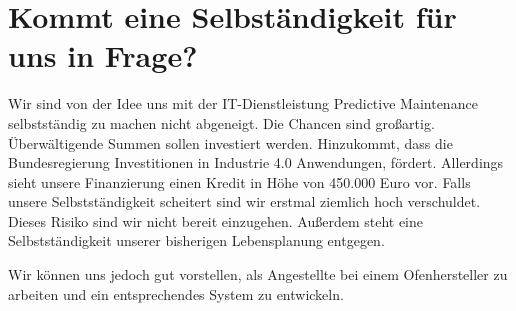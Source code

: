 \section{Kommt eine Selbständigkeit für uns in Frage?}
Wir sind von der Idee uns mit der IT-Dienstleistung Predictive Maintenance selbstständig zu machen nicht abgeneigt. Die Chancen sind großartig. Überwältigende Summen sollen investiert werden. Hinzukommt, dass die Bundesregierung Investitionen in Industrie 4.0 Anwendungen, fördert. Allerdings sieht unsere Finanzierung einen Kredit in Höhe von 450.000 Euro vor. Falls unsere Selbstständigkeit scheitert sind wir erstmal ziemlich hoch verschuldet. Dieses Risiko sind wir nicht bereit einzugehen. Außerdem steht eine Selbstständigkeit unserer bisherigen Lebensplanung entgegen. 

Wir können uns jedoch gut vorstellen, als Angestellte bei einem Ofenhersteller zu arbeiten und ein entsprechendes System zu entwickeln.